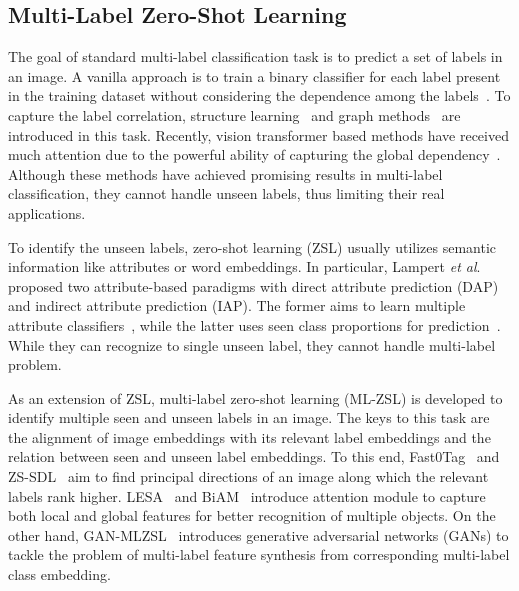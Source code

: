 \documentclass[letterpaper]{article} %
\newcommand{\etal}{\emph{et al}.}
\begin{document}
\subsection{Multi-Label Zero-Shot Learning}
The goal of standard multi-label classification task is to predict a set of labels in an image. 
A vanilla approach is to train a binary classifier for each label present in the training dataset without considering the dependence among the labels~\cite{tsoumakas2007multi, read2011classifier}. 
To capture the label correlation, structure learning~\cite{gong2014deep,Wang_2016_CVPR,Zhu_2017_CVPR,Wang_2017_ICCV} and graph methods~\cite{Li_2016_CVPR,Lee_2018_CVPR,Chen_2019_CVPR} are introduced in this task. 
Recently, vision transformer based methods have received much attention due to the powerful ability of  capturing the global dependency~\cite{lanchantin2021general,liu2021query2label,cheng2021mltr}.
Although these methods have achieved promising results in multi-label classification, they cannot handle unseen labels, thus limiting their real applications. \par
To identify the unseen labels, zero-shot learning (ZSL) usually utilizes semantic information like attributes or word embeddings\cite{mikolov2013distributed,Xian_2017_CVPR}.
In particular,
Lampert \etal~\cite{5206594} proposed two attribute-based paradigms with direct attribute prediction (DAP) and indirect attribute prediction (IAP). 
The former aims to learn multiple attribute classifiers~\cite{6571196}, while the latter uses seen class proportions for prediction~\cite{Zhang_2015_ICCV}. 
While they can recognize to single unseen label, they cannot handle multi-label problem. 
\par
As an extension of ZSL,
multi-label zero-shot learning (ML-ZSL) is developed to identify multiple seen and unseen labels in an image.
The keys to this task are the alignment of image embeddings with its relevant label embeddings and the relation between seen and unseen label embeddings.
To this end, Fast0Tag~\cite{fast0tag} and ZS-SDL~\cite{zssdl} aim to find principal directions of an image along which the relevant labels rank higher.
LESA~\cite{lesa} and BiAM~\cite{biam} introduce attention module to capture both local and global features for better recognition of multiple objects.
On the other hand, GAN-MLZSL~\cite{ganmlzsl} introduces generative adversarial networks (GANs) to tackle the problem of multi-label feature synthesis from corresponding multi-label class embedding. \par
\end{document}
